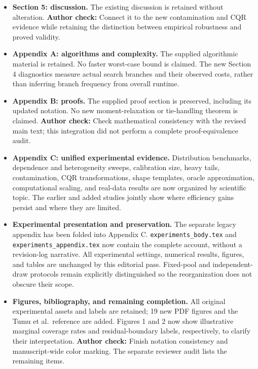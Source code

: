 \documentclass[10pt]{article}
\newcommand{\checkauthor}[1]{\textcolor{red!65!black}{\textbf{Author check:} #1}}
\begin{document}
\begin{itemize}
\item \textbf{Section 5: discussion.}
The existing discussion is retained without alteration.
\checkauthor{Connect it to the new contamination and CQR evidence while
retaining the distinction between empirical robustness and proved validity.}

\item \textbf{Appendix A: algorithms and complexity.}
The supplied algorithmic material is retained. No faster worst-case bound is
claimed. The new Section 4 diagnostics measure actual search branches and
their observed costs, rather than inferring branch frequency from overall runtime.

\item \textbf{Appendix B: proofs.}
The supplied proof section is preserved, including its updated notation.
No new moment-relaxation or tie-handling theorem is claimed.
\checkauthor{Check mathematical consistency with the revised main text; this
integration did not perform a complete proof-equivalence audit.}

\item \textbf{Appendix C: unified experimental evidence.}
Distribution benchmarks, dependence and heterogeneity sweeps, calibration
size, heavy tails, contamination, CQR transformations, shape templates,
oracle approximation, computational scaling, and real-data results are now
organized by scientific topic. The earlier and added studies jointly show
where efficiency gains persist and where they are limited.

\item \textbf{Experimental presentation and preservation.}
The separate legacy appendix has been folded into Appendix C.
\texttt{experiments\_body.tex} and \texttt{experiments\_appendix.tex} now
contain the complete account, without a revision-log narrative. All
experimental settings, numerical results, figures, and tables are unchanged
by this editorial pass. Fixed-pool and independent-draw protocols remain
explicitly distinguished so the reorganization does not obscure their scope.

\item \textbf{Figures, bibliography, and remaining completion.}
All original experimental assets and labels are retained; 19 new PDF figures
and the Tumu et al.\ reference are added. Figures 1 and 2 now show illustrative
marginal coverage rates and residual-boundary labels, respectively, to clarify
their interpretation. \checkauthor{Finish notation consistency and
manuscript-wide color marking.} The separate reviewer audit lists the remaining items.
\end{itemize}
\end{document}
